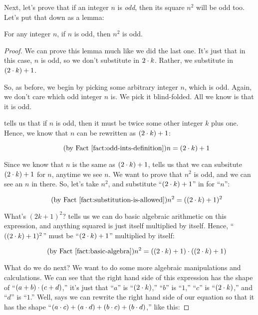 \documentclass[../../../main.tex]{subfiles}
\begin{document}
Next, let's prove that if an integer $n$ is \emph{odd}, then its square $n^{2}$ will be odd too. Let's put that down as a lemma:

\begin{lemma}
  \label{lemma:if-n-is-odd-then-n-squared-is-odd}
  For any integer $n$, if $n$ is odd, then $n^{2}$ is odd.
\end{lemma}

\begin{proof}

We can prove this lemma much like we did the last one. It's just that in this case, $n$ is odd, so we don't substitute in $2 \mult/ k$. Rather, we substitute in $(2 \mult/ k) + 1$.

So, as before, we begin by picking some arbitrary integer $n$, which is odd. Again, we don't care which odd integer $n$ is. We pick it blind-folded. All we know is that it is odd. 

 tells us that if $n$ is odd, then it must be twice some other integer $k$ plus one. Hence, we know that $n$ can be rewritten as $(2 \mult/ k) + 1$:

\begin{equation*}
  \tag{by \factref{fact:odd-ints-definition}}
  n = (2 \mult/ k) + 1
\end{equation*}

Since we know that $n$ is the same as $(2 \mult/ k) + 1$,  tells us that we can subsitute $(2 \mult/ k) + 1$ for $n$, anytime we see $n$. We want to prove that $n^{2}$ is odd, and we can see an $n$ in there. So, let's take $n^{2}$, and substitute ``$(2 \mult/ k) + 1$'' in for ``$n$'':

\begin{equation*}
  \tag{by \factref{fact:substitution-is-allowed}}
  n^{2} = ((2 \mult/ k) + 1)^{2}
\end{equation*}

What's $(2k + 1)^{2}$?  tells us we can do basic algebraic arithmetic on this expression, and anything squared is just itself multiplied by itself. Hence, ``$((2 \mult/ k) + 1)^{2}$'' must be ``$(2 \mult/ k) + 1$'' multiplied by itself:

\begin{equation*}
  \tag{by \factref{fact:basic-algebra}}
  n^{2} = ((2 \mult/ k) + 1) \mult/ ((2 \mult/ k) + 1)
\end{equation*}

What do we do next? We want to do some more algebraic manipulations and calculations. We can see that the right hand side of this expression has the shape of ``$(a + b) \mult/ (c + d)$,'' it's just that ``$a$'' is ``$(2 \mult/ k)$,'' ``$b$'' is ``$1$,'' ``$c$'' is ``$(2 \mult/ k)$,'' and ``$d$'' is ``$1$.'' Well,  says we can rewrite the right hand side of our equation so that it has the shape ``$(a \mult/ c) + (a \mult/ d) + (b \mult/ c) + (b \mult/ d)$,'' like this:


\end{proof}
\end{document}
